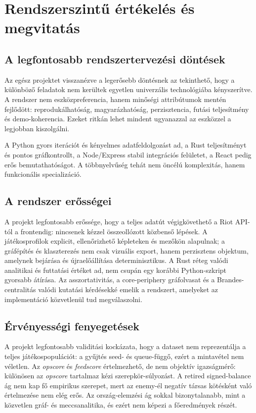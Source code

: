 \chapter{Rendszerszintű értékelés és megvitatás}

\section{A legfontosabb rendszertervezési döntések}

Az egész projektet visszanézve a legerősebb döntésnek az tekinthető, hogy a különböző feladatok nem kerültek egyetlen univerzális technológiába kényszerítve. A rendszer nem eszközpreferencia, hanem minőségi attribútumok mentén fejlődött: reprodukálhatóság, magyarázhatóság, perzisztencia, futási teljesítmény és demo-koherencia. Ezeket ritkán lehet mindent ugyanazzal az eszközzel a legjobban kiszolgálni.

A Python gyors iterációt és kényelmes adatfeldolgozást ad, a Rust teljesítményt és pontos gráfkontrollt, a Node/Express stabil integrációs felületet, a React pedig erős bemutathatóságot. A többnyelvűség tehát nem öncélú komplexitás, hanem funkcionális specializáció.

\section{A rendszer erősségei}

A projekt legfontosabb erőssége, hogy a teljes adatút végigkövethető a Riot API-tól a frontendig: nincsenek kézzel összeollózott közbenső lépések. A játékosprofilok explicit, ellenőrizhető képleteken és mezőkön alapulnak; a gráfépítés és klaszterezés nem csak vizuális export, hanem perzisztens objektum, amelynek bejárása és újraelőállítása determinisztikus. A Rust réteg valódi analitikai és futtatási értéket ad, nem csupán egy korábbi Python-szkript gyorsabb átírása. Az asszortativitás, a core-periphery gráfolvasat és a Brandes-centralitás valódi kutatási kérdésekké emelik a rendszert, amelyeket az implementáció közvetlenül tud megválaszolni.

\section{Érvényességi fenyegetések}

A projekt legfontosabb validitási kockázata, hogy a dataset nem reprezentálja a teljes játékospopulációt: a gyűjtés seed- és queue-függő, ezért a mintavétel nem véletlen. Az \textit{opscore} és \textit{feedscore} értelmezhető, de nem objektív igazságmérő: különösen az \textit{opscore} tartalmaz kézi szerepkör-súlyozást. A retired signed-balance ág nem kap fő empirikus szerepet, mert az enemy-él negatív társas kötésként való értelmezése nem elég erős. Az ország-elemzési ág sokkal bizonytalanabb, mint a közvetlen gráf- és meccsanalitika, és ezért nem képezi a főeredmények részét.

